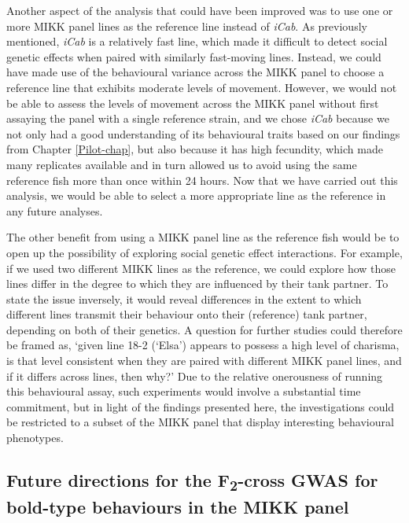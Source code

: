 \documentclass[
]{book}
\begin{document}
Another aspect of the analysis that could have been improved was to use one or more MIKK panel lines as the reference line instead of \emph{\textcolor{iCab_424B4D}{iCab}}. As previously mentioned, \emph{\textcolor{iCab_424B4D}{iCab}} is a relatively fast line, which made it difficult to detect social genetic effects when paired with similarly fast-moving lines. Instead, we could have made use of the behavioural variance across the MIKK panel to choose a reference line that exhibits moderate levels of movement. However, we would not be able to assess the levels of movement across the MIKK panel without first assaying the panel with a single reference strain, and we chose \emph{\textcolor{iCab_424B4D}{iCab}} because we not only had a good understanding of its behavioural traits based on our findings from Chapter \ref{Pilot-chap}, but also because it has high fecundity, which made many replicates available and in turn allowed us to avoid using the same reference fish more than once within 24 hours. Now that we have carried out this analysis, we would be able to select a more appropriate line as the reference in any future analyses.

The other benefit from using a MIKK panel line as the reference fish would be to open up the possibility of exploring social genetic effect interactions. For example, if we used two different MIKK lines as the reference, we could explore how those lines differ in the degree to which they are influenced by their tank partner. To state the issue inversely, it would reveal differences in the extent to which different lines transmit their behaviour onto their (reference) tank partner, depending on both of their genetics. A question for further studies could therefore be framed as, `given line \textcolor{18-2 (‘Elsa’)_FF66A6}{18-2 (‘Elsa’)} appears to possess a high level of charisma, is that level consistent when they are paired with different MIKK panel lines, and if it differs across lines, then why?' Due to the relative onerousness of running this behavioural assay, such experiments would involve a substantial time commitment, but in light of the findings presented here, the investigations could be restricted to a subset of the MIKK panel that display interesting behavioural phenotypes.

\hypertarget{future-directions-for-the-f2-cross-gwas-for-bold-type-behaviours-in-the-mikk-panel}{%
\subsection{\texorpdfstring{Future directions for the F\textsubscript{2}-cross GWAS for bold-type behaviours in the MIKK panel}{Future directions for the F2-cross GWAS for bold-type behaviours in the MIKK panel}}\label{future-directions-for-the-f2-cross-gwas-for-bold-type-behaviours-in-the-mikk-panel}}
\end{document}

